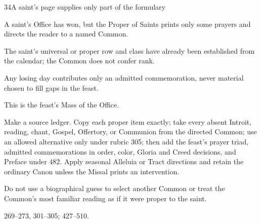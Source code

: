 \begin{casefile}{34}{A saint's page supplies only part of the formulary}
\item[Calendar facts] A saint's Office has won, but the Proper of Saints prints only some prayers and directs the reader to a named Common.
\item[Ranks and rows] The saint's universal or proper row and class have already been established from the calendar; the Common does not confer rank.
\item[Impeded item] Any losing day contributes only an admitted commemoration, never material chosen to fill gaps in the feast.
\item[Mass category] This is the feast's Mass of the Office.
\item[Assembly] Make a source ledger.  Copy each proper item exactly; take every absent Introit, reading, chant, Gospel, Offertory, or Communion from the directed Common; use an allowed alternative only under rubric 305; then add the feast's prayer triad, admitted commemorations in order, color, Gloria and Creed decisions, and Preface under 482.  Apply seasonal Alleluia or Tract directions and retain the ordinary Canon unless the Missal prints an intervention.
\item[Boundary] Do not use a biographical guess to select another Common or treat the Common's most familiar reading as if it were proper to the saint.
\item[Rubric locus] 269--273, 301--305; 427--510.
\end{casefile}

